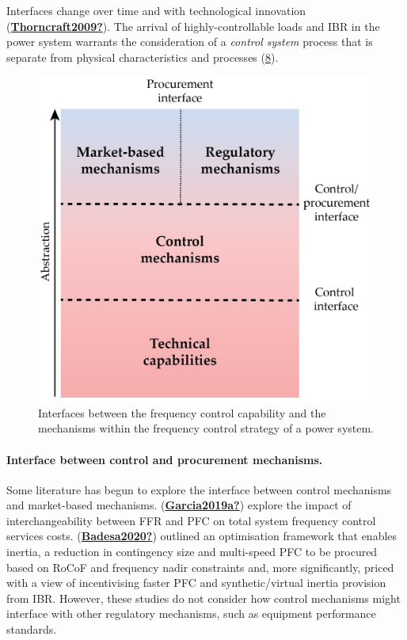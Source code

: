 \documentclass[12pt,a4paper,]{report}
\begin{document}
Interfaces change over time and with technological innovation
(\protect\hyperlink{ref-Thorncraft2009}{\textbf{Thorncraft2009?}}). The
arrival of highly-controllable loads and IBR in the power system
warrants the consideration of a \emph{control system} process that is
separate from physical characteristics and processes
(\protect\hyperlink{fig:interfaces}{8}).

\begin{figure}
\hypertarget{fig:interfaces}{%
\centering
\includegraphics{source/figures/interfaces_03.png}
\caption{Interfaces between the frequency control capability and the
mechanisms within the frequency control strategy of a power
system.}\label{fig:interfaces}
}
\end{figure}

\hypertarget{interface-between-control-and-procurement-mechanisms.}{%
\paragraph{Interface between control and procurement
mechanisms.}\label{interface-between-control-and-procurement-mechanisms.}}

Some literature has begun to explore the interface between control
mechanisms and market-based mechanisms.
(\protect\hyperlink{ref-Garcia2019a}{\textbf{Garcia2019a?}}) explore the
impact of interchangeability between FFR and PFC on total system
frequency control services costs.
(\protect\hyperlink{ref-Badesa2020}{\textbf{Badesa2020?}}) outlined an
optimisation framework that enables inertia, a reduction in contingency
size and multi-speed PFC to be procured based on RoCoF and frequency
nadir constraints and, more significantly, priced with a view of
incentivising faster PFC and synthetic/virtual inertia provision from
IBR. However, these studies do not consider how control mechanisms might
interface with other regulatory mechanisms, such as equipment
performance standards.
\end{document}
